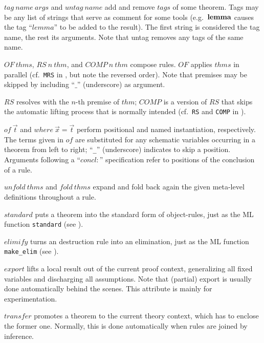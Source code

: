 \begin{descr}
\item [$tag~name~args$ and $untag~name$] add and remove $tags$ of some
  theorem.  Tags may be any list of strings that serve as comment for some
  tools (e.g.\ ${\mathord{\mathbf{lemma}}}$ causes the tag ``$lemma$'' to be added to the
  result).  The first string is considered the tag name, the rest its
  arguments.  Note that untag removes any tags of the same name.
\item [$OF~thms$, $RS~n~thm$, and $COMP~n~thm$] compose rules.  $OF$ applies
  $thms$ in parallel (cf.\ \texttt{MRS} in \cite[\S5]{isabelle-ref}, but note
  the reversed order).  Note that premises may be skipped by including
  ``$\_$'' (underscore) as argument.
  
  $RS$ resolves with the $n$-th premise of $thm$; $COMP$ is a version of $RS$
  that skips the automatic lifting process that is normally intended (cf.\ 
  \texttt{RS} and \texttt{COMP} in \cite[\S5]{isabelle-ref}).
  
\item [$of~\vec t$ and $where~\vec x = \vec t$] perform positional and named
  instantiation, respectively.  The terms given in $of$ are substituted for
  any schematic variables occurring in a theorem from left to right;
  ``\texttt{_}'' (underscore) indicates to skip a position.  Arguments
  following a ``$concl\colon$'' specification refer to positions of the
  conclusion of a rule.
  
\item [$unfold~thms$ and $fold~thms$] expand and fold back again the given
  meta-level definitions throughout a rule.
 
\item [$standard$] puts a theorem into the standard form of object-rules, just
  as the ML function \texttt{standard} (see \cite[\S5]{isabelle-ref}).
  
\item [$elimify$] turns an destruction rule into an elimination, just as the
  ML function \texttt{make\_elim} (see \cite{isabelle-ref}).
  
\item [$export$] lifts a local result out of the current proof context,
  generalizing all fixed variables and discharging all assumptions.  Note that
  (partial) export is usually done automatically behind the scenes.  This
  attribute is mainly for experimentation.
  
\item [$transfer$] promotes a theorem to the current theory context, which has
  to enclose the former one.  Normally, this is done automatically when rules
  are joined by inference.

\end{descr}


